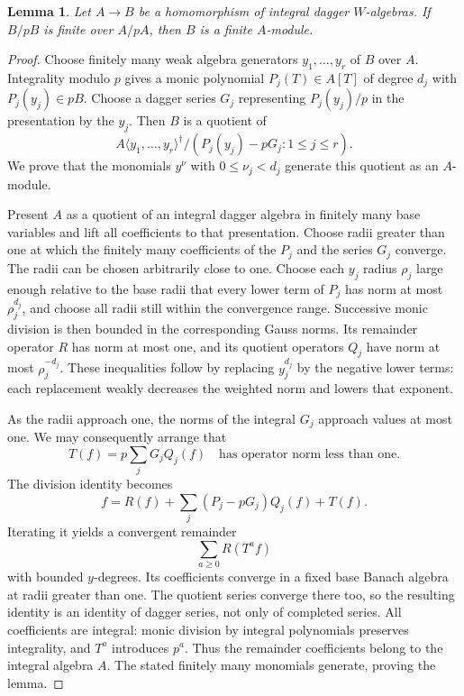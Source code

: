\documentclass[11pt]{article}
\newtheorem{lemma}[theorem]{Lemma}\newtheorem{proposition}[theorem]{Proposition}
\theoremstyle{definition}\newtheorem{definition}[theorem]{Definition}
\theoremstyle{remark}\newtheorem{remark}[theorem]{Remark}
\begin{document}
\begin{lemma}\label{lem:finite}
Let $A\to B$ be a homomorphism of integral dagger $W$-algebras. If $B/pB$ is finite over $A/pA$, then $B$ is a finite $A$-module.
\end{lemma}
\begin{proof}
Choose finitely many weak algebra generators $y_1,\ldots,y_r$ of $B$ over $A$. Integrality modulo $p$ gives a monic polynomial $P_j(T)\in A[T]$ of degree $d_j$ with $P_j(y_j)\in pB$. Choose a dagger series $G_j$ representing $P_j(y_j)/p$ in the presentation by the $y_j$. Then $B$ is a quotient of
\[
 A\langle y_1,\ldots,y_r\rangle^\dagger/
        (P_j(y_j)-pG_j:1\leq j\leq r).
\]
We prove that the monomials $y^\nu$ with $0\leq\nu_j<d_j$ generate this quotient as an $A$-module.

Present $A$ as a quotient of an integral dagger algebra in finitely many base variables and lift all coefficients to that presentation. Choose radii greater than one at which the finitely many coefficients of the $P_j$ and the series $G_j$ converge. The radii can be chosen arbitrarily close to one. Choose each $y_j$ radius $\rho_j$ large enough relative to the base radii that every lower term of $P_j$ has norm at most $\rho_j^{d_j}$, and choose all radii still within the convergence range. Successive monic division is then bounded in the corresponding Gauss norms. Its remainder operator $R$ has norm at most one, and its quotient operators $Q_j$ have norm at most $\rho_j^{-d_j}$. These inequalities follow by replacing $y_j^{d_j}$ by the negative lower terms: each replacement weakly decreases the weighted norm and lowers that exponent.

As the radii approach one, the norms of the integral $G_j$ approach values at most one. We may consequently arrange that
\[
 T(f)=p\sum_jG_jQ_j(f)
 \quad\text{has operator norm less than one}.
\]
The division identity becomes
\[
 f=R(f)+\sum_j(P_j-pG_j)Q_j(f)+T(f).
\]
Iterating it yields a convergent remainder
\[
 \sum_{a\geq0}R(T^af)
\]
with bounded $y$-degrees. Its coefficients converge in a fixed base Banach algebra at radii greater than one. The quotient series converge there too, so the resulting identity is an identity of dagger series, not only of completed series. All coefficients are integral: monic division by integral polynomials preserves integrality, and $T^a$ introduces $p^a$. Thus the remainder coefficients belong to the integral algebra $A$. The stated finitely many monomials generate, proving the lemma.
\end{proof}
\end{document}

